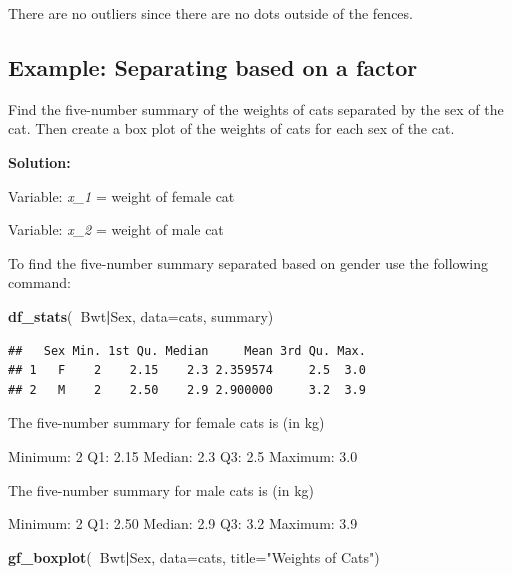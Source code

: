 \documentclass[
]{book}
\newenvironment{Shaded}{\begin{snugshade}}{\end{snugshade}}
\newcommand{\DataTypeTok}[1]{\textcolor[rgb]{0.13,0.29,0.53}{#1}}
\newcommand{\KeywordTok}[1]{\textcolor[rgb]{0.13,0.29,0.53}{\textbf{#1}}}
\newcommand{\NormalTok}[1]{#1}
\newcommand{\OperatorTok}[1]{\textcolor[rgb]{0.81,0.36,0.00}{\textbf{#1}}}
\newcommand{\StringTok}[1]{\textcolor[rgb]{0.31,0.60,0.02}{#1}}
\begin{document}
There are no outliers since there are no dots outside of the fences.

\hypertarget{example-separating-based-on-a-factor}{%
\subsection{Example: Separating based on a factor}\label{example-separating-based-on-a-factor}}

Find the five-number summary of the weights of cats separated by the sex of the cat. Then create a box plot of the weights of cats for each sex of the cat.

\textbf{Solution:}

Variable: \emph{x\_1} = weight of female cat

Variable: \emph{x\_2} = weight of male cat

To find the five-number summary separated based on gender use the following command:

\begin{Shaded}
\begin{Highlighting}[]
\KeywordTok{df_stats}\NormalTok{(}\OperatorTok{~}\NormalTok{Bwt}\OperatorTok{|}\NormalTok{Sex, }\DataTypeTok{data=}\NormalTok{cats, summary)}
\end{Highlighting}
\end{Shaded}

\begin{verbatim}
##   Sex Min. 1st Qu. Median     Mean 3rd Qu. Max.
## 1   F    2    2.15    2.3 2.359574     2.5  3.0
## 2   M    2    2.50    2.9 2.900000     3.2  3.9
\end{verbatim}

The five-number summary for female cats is (in kg)

Minimum: 2
Q1: 2.15
Median: 2.3
Q3: 2.5
Maximum: 3.0

The five-number summary for male cats is (in kg)

Minimum: 2
Q1: 2.50
Median: 2.9
Q3: 3.2
Maximum: 3.9



\begin{Shaded}
\begin{Highlighting}[]
\KeywordTok{gf_boxplot}\NormalTok{(}\OperatorTok{~}\NormalTok{Bwt}\OperatorTok{|}\NormalTok{Sex, }\DataTypeTok{data=}\NormalTok{cats, }\DataTypeTok{title=}\StringTok{"Weights of Cats"}\NormalTok{)}
\end{Highlighting}
\end{Shaded}
\end{document}
